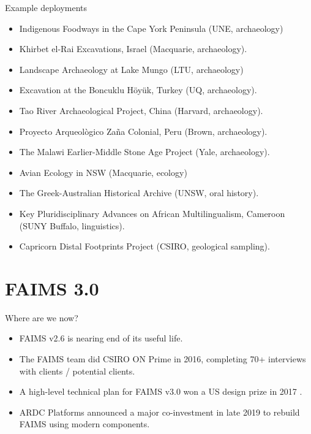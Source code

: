 \documentclass[aspectratio=169, 12pt]{beamer} %
\begin{document}
\begin{frame}{Example deployments}
 \begin{itemize}[label=\textbullet]
        \item Indigenous Foodways in the Cape York Peninsula (UNE, archaeology)
        \item Khirbet el-Rai Excavations, Israel (Macquarie, archaeology).
        \item Landscape Archaeology at Lake Mungo (LTU, archaeology)
        \item Excavation at the Boncuklu Höyük, Turkey (UQ, archaeology).
        \item Tao River Archaeological Project, China (Harvard, archaeology).
        \item Proyecto Arqueològico Zaña Colonial, Peru (Brown, archaeology).
        \item The Malawi Earlier-Middle Stone Age Project (Yale, archaeology).
        \item Avian Ecology in NSW (Macquarie, ecology)
        \item The Greek-Australian Historical Archive (UNSW, oral history).
        \item Key Pluridisciplinary Advances on African Multilingualism, Cameroon (SUNY Buffalo, linguistics).
        \item Capricorn Distal Footprints Project (CSIRO, geological sampling).

    \end{itemize}
\end{frame}

\section{FAIMS 3.0}

\begin{frame}{Where are we now?}
    \begin{itemize}[label=\textbullet]
        \item FAIMS v2.6 is nearing end of its useful life.
        \item The FAIMS team did CSIRO ON Prime in 2016, completing 70+ interviews with clients / potential clients.
        \item A high-level technical plan for FAIMS v3.0 won a US design prize in 2017 \cite{Bureau_of_Reclamation2017-xl}.
        \item ARDC Platforms announced a major co-investment in late 2019 to rebuild FAIMS using modern components.
    \end{itemize}
\end{frame}
\end{document}
